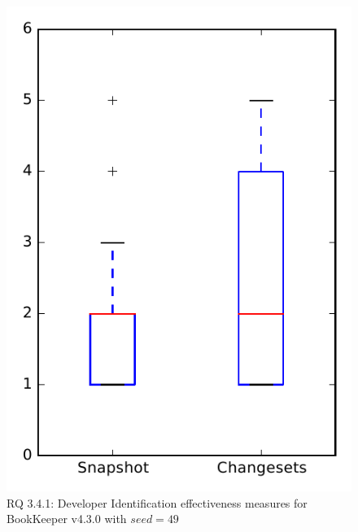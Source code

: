 
\begin{figure}
\centering
\includegraphics[height=0.4\textheight]{figures/dit_seed/rq1_bookkeeper_49}
\caption{RQ 3.4.1: Developer Identification effectiveness measures for BookKeeper v4.3.0 with $seed=49$}
\label{fig:dit_seed:rq1:bookkeeper}
\end{figure}
